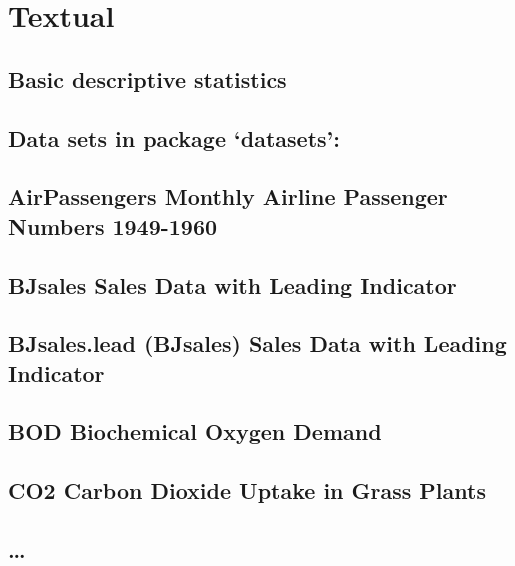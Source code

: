 \documentclass[]{book}
\theoremstyle{definition}
\theoremstyle{definition}
\theoremstyle{definition}
\theoremstyle{remark}
\begin{document}
\chapter{Textual}\label{textual}

\section{Basic descriptive
statistics}\label{basic-descriptive-statistics}

\section{\texorpdfstring{Data sets in package
`datasets':}{Data sets in package datasets:}}\label{data-sets-in-package-datasets}

\section{AirPassengers Monthly Airline Passenger Numbers
1949-1960}\label{airpassengers-monthly-airline-passenger-numbers-1949-1960}

\section{BJsales Sales Data with Leading
Indicator}\label{bjsales-sales-data-with-leading-indicator}

\section{BJsales.lead (BJsales) Sales Data with Leading
Indicator}\label{bjsales.lead-bjsales-sales-data-with-leading-indicator}

\section{BOD Biochemical Oxygen
Demand}\label{bod-biochemical-oxygen-demand}

\section{CO2 Carbon Dioxide Uptake in Grass
Plants}\label{co2-carbon-dioxide-uptake-in-grass-plants}

\section{\ldots{}}\label{section}
\end{document}
